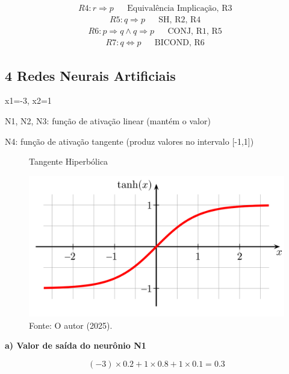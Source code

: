 
\begin{align*}
    R4: r \Rightarrow p && \text{Equivalência Implicação, R3 }
\end{align*}
\begin{align*}
    R5: q \Rightarrow p && \text{SH, R2, R4 }
\end{align*}
\begin{align*}
    R6: p \Rightarrow q \land q \Rightarrow p && \text{CONJ, R1, R5 }
\end{align*}
\begin{align*}
    R7: q \Leftrightarrow p && \text{BICOND, R6 }
\end{align*}


\subsection*{\textbf{4 Redes Neurais Artificiais}}

x1=-3, x2=1

N1, N2, N3: função de ativação linear (mantém o valor)

N4: função de ativação tangente (produz valores no intervalo [-1,1])

\begin{figure}[!h]
\centering
\caption{Tangente Hiperbólica}
\includegraphics[width=0.6\linewidth]{apendices/fig/1_IAA001_5.png}
\caption*{Fonte: O autor (2025).}
\label{tanh}
\end{figure}


\begin{adjustwidth}{1em}{}
\textbf{a) Valor de saída do neurônio N1}
\end{adjustwidth}
\begin{equation*}
    (-3)\times0.2 + 1\times0.8 + 1\times0.1 = 0.3
\end{equation*}

